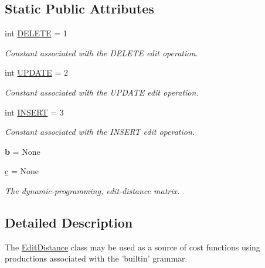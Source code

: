 \subsection*{Static Public Attributes}
\begin{DoxyCompactItemize}
\item 
int \hyperlink{classxutools_1_1distances_1_1_edit_distance_aaa1544e3e291d6c7d8bc51e61189dcd1}{D\-E\-L\-E\-T\-E} = 1
\begin{DoxyCompactList}\small\item\em Constant associated with the D\-E\-L\-E\-T\-E edit operation. \end{DoxyCompactList}\item 
int \hyperlink{classxutools_1_1distances_1_1_edit_distance_a27373ca74c5dad1c376df5087c0c7e5c}{U\-P\-D\-A\-T\-E} = 2
\begin{DoxyCompactList}\small\item\em Constant associated with the U\-P\-D\-A\-T\-E edit operation. \end{DoxyCompactList}\item 
int \hyperlink{classxutools_1_1distances_1_1_edit_distance_a76c00e94c810634eee296a4e298f86d2}{I\-N\-S\-E\-R\-T} = 3
\begin{DoxyCompactList}\small\item\em Constant associated with the I\-N\-S\-E\-R\-T edit operation. \end{DoxyCompactList}\item 
\hypertarget{classxutools_1_1distances_1_1_edit_distance_a13e47e3711a07838f57b1f6e6101f672}{{\bfseries b} = None}\label{classxutools_1_1distances_1_1_edit_distance_a13e47e3711a07838f57b1f6e6101f672}

\item 
\hypertarget{classxutools_1_1distances_1_1_edit_distance_a537a6361c0f5c863fc14eb25780660b0}{\hyperlink{classxutools_1_1distances_1_1_edit_distance_a537a6361c0f5c863fc14eb25780660b0}{c} = None}\label{classxutools_1_1distances_1_1_edit_distance_a537a6361c0f5c863fc14eb25780660b0}

\begin{DoxyCompactList}\small\item\em The dynamic-\/programming, edit-\/distance matrix. \end{DoxyCompactList}\end{DoxyCompactItemize}


\subsection{Detailed Description}
The \hyperlink{classxutools_1_1distances_1_1_edit_distance}{Edit\-Distance} class may be used as a source of cost functions using productions associated with the 'builtin' grammar. 

